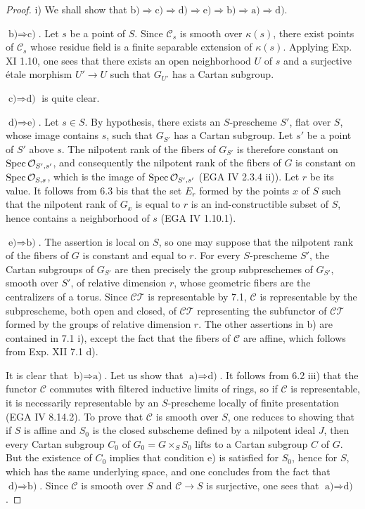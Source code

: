 \begin{proof}
i) We shall show that $\text{b)}\Rightarrow\text{c)}\Rightarrow\text{d)}\Rightarrow\text{e)}\Rightarrow\text{b)}\Rightarrow\text{a)}\Rightarrow\text{d)}$.

$\text{b)}\Rightarrow\text{c)}$. Let $s$ be a point of $S$. Since $\mathscr C_s$ is smooth over $\kappa(s)$, there exist points of $\mathscr C_s$ whose residue field is a finite separable extension of $\kappa(s)$. Applying Exp. XI 1.10, one sees that there exists an open neighborhood $U$ of $s$ and a surjective étale morphism $U'\to U$ such that $G_{U'}$ has a Cartan subgroup.

$\text{c)}\Rightarrow\text{d)}$ is quite clear.

$\text{d)}\Rightarrow\text{e)}$. Let $s\in S$. By hypothesis, there exists an $S$-prescheme $S'$, flat over $S$, whose image contains $s$, such that $G_{S'}$ has a Cartan subgroup. Let $s'$ be a point of $S'$ above $s$. The nilpotent rank of the fibers of $G_{S'}$ is therefore constant on $\operatorname{Spec}\mathcal{O}_{S',s'}$, and consequently the nilpotent rank of the fibers of $G$ is constant on $\operatorname{Spec}\mathcal{O}_{S,s}$, which is the image of $\operatorname{Spec}\mathcal{O}_{S',s'}$ (EGA IV 2.3.4 ii)). Let $r$ be its value. It follows from 6.3 bis that the set $E_r$ formed by the points $x$ of $S$ such that the nilpotent rank of $G_x$ is equal to $r$ is an ind-constructible subset of $S$, hence contains a neighborhood of $s$ (EGA IV 1.10.1).

$\text{e)}\Rightarrow\text{b)}$. The assertion is local on $S$, so one may suppose that the nilpotent rank of the fibers of $G$ is constant and equal to $r$. For every $S$-prescheme $S'$, the Cartan subgroups of $G_{S'}$ are then precisely the group subpreschemes of $G_{S'}$, smooth over $S'$, of relative dimension $r$, whose geometric fibers are the centralizers of a torus. Since $\mathscr{CT}$ is representable by 7.1, $\mathscr C$ is representable by the subprescheme, both open and closed, of $\mathscr{CT}$ representing the subfunctor of $\mathscr{CT}$ formed by the groups of relative dimension $r$. The other assertions in b) are contained in 7.1 i), except the fact that the fibers of $\mathscr C$ are affine, which follows from Exp. XII 7.1 d).

It is clear that $\text{b)}\Rightarrow\text{a)}$. Let us show that $\text{a)}\Rightarrow\text{d)}$. It follows from 6.2 iii) that the functor $\mathscr C$ commutes with filtered inductive limits of rings, so if $\mathscr C$ is representable, it is necessarily representable by an $S$-prescheme locally of finite presentation (EGA IV 8.14.2). To prove that $\mathscr C$ is smooth over $S$, one reduces to showing that if $S$ is affine and $S_0$ is the closed subscheme defined by a nilpotent ideal $J$, then every Cartan subgroup $C_0$ of $G_0=G\times_S S_0$ lifts to a Cartan subgroup $C$ of $G$. But the existence of $C_0$ implies that condition e) is satisfied for $S_0$, hence for $S$, which has the same underlying space, and one concludes from the fact that $\text{d)}\Rightarrow\text{b)}$. Since $\mathscr C$ is smooth over $S$ and $\mathscr C\to S$ is surjective, one sees that $\text{a)}\Rightarrow\text{d)}$.


\end{proof}
